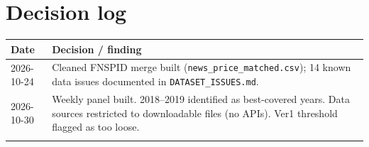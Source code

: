 \documentclass[11pt]{article}
\newcommand{\var}[1]{\texttt{#1}}
\begin{document}
\section{Decision log}
\begin{tabularx}{\textwidth}{p{2.2cm} X}
\toprule
Date & Decision / finding\\
\midrule
2026-10-24 & Cleaned FNSPID merge built (\var{news\_price\_matched.csv}); 14 known data issues documented in \var{DATASET\_ISSUES.md}.\\
2026-10-30 & Weekly panel built. 2018--2019 identified as best-covered years. Data sources restricted to downloadable files (no APIs). Ver1 threshold flagged as too loose.\\
 & \\
\bottomrule
\end{tabularx}
\end{document}
